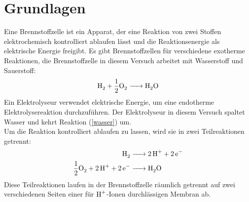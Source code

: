 \documentclass[a4paper,12pt,bibtotocnumbered]{scrartcl}
\numberwithin{equation}{section} %
\begin{document}
\section{Grundlagen}
Eine Brennstoffzelle ist ein Apparat, der eine Reaktion von zwei Stoffen elektrochemisch kontrolliert ablaufen lässt und die Reaktionsenergie als elektrische Energie freigibt. Es gibt Brennstoffzellen für verschiedene exotherme Reaktionen, die Brennstoffzelle in diesem Versuch arbeitet mit Wasserstoff und Sauerstoff:
\begin{equation}\label{wasser}
\ce{H_2 + \frac{1}{2}O_2 -> H_2O}
\end{equation}
Ein Elektrolyseur verwendet elektrische Energie, um eine endotherme Elektrolysereaktion durchzuführen. Der Elektrolyseur in diesem Versuch spaltet Wasser und kehrt Reaktion (\ref{wasser}) um.\\
Um die Reaktion kontrolliert ablaufen zu lassen, wird sie in zwei Teilreaktionen getrennt:
\begin{align}
\ce{H_2 &-> 2H^+ + 2e^-} \\
\ce{\frac{1}{2}O_2 + 2H^+ + 2e^- &->H_2O}
\end{align}
Diese Teilreaktionen laufen in der Brennstoffzelle räumlich getrennt auf zwei verschiedenen Seiten einer für $\ce{H^+}$-Ionen durchlässigen Membran ab. 
\end{document}
